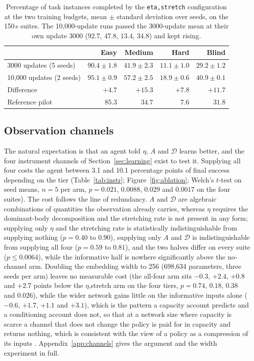 \documentclass[11pt]{article}
\newcommand{\dd}{\mathcal{D}}
\newcommand{\code}[1]{\texttt{\small #1}}
\begin{document}
\begin{table}[t]
\centering
\small
\begin{tabular}{lrrrr}
\toprule
& Easy & Medium & Hard & Blind \\
\midrule
3000 updates (5 seeds)   & $90.4 \pm 1.8$ & $41.9 \pm 2.3$ & $11.1 \pm 1.0$ & $29.2 \pm 1.2$ \\
10,000 updates (2 seeds) & $95.1 \pm 0.9$ & $57.2 \pm 2.5$ & $18.9 \pm 0.6$ & $40.9 \pm 0.1$ \\
\midrule
Difference               & $+4.7$ & $+15.3$ & $+7.8$ & $+11.7$ \\
Reference pilot          & $85.3$ & $34.7$ & $7.6$ & $31.8$ \\
\bottomrule
\end{tabular}
\caption{Percentage of task instances completed by the \code{eta,stretch}
configuration at the two training budgets, mean $\pm$ standard deviation
over seeds, on the 150\,s suites. The 10,000-update runs passed the
3000-update mean at their own update 3000 ($92.7$, $47.8$, $13.4$, $34.8$)
and kept rising.}
\label{tab:budget}
\end{table}

\subsection{Observation channels}
\label{sec:instruments}

The natural expectation is that an agent told $\eta$, $A$ and $\dd$ learns
better, and the four instrument channels of Section~\ref{sec:learning}
exist to test it. Supplying all four costs the agent between 3.1 and 10.1
percentage points of final success depending on the tier
(Table~\ref{tab:instr}; Figure~\ref{fig:ablation}; Welch's $t$-test on seed
means, $n = 5$ per arm, $p = 0.021$, $0.0088$, $0.029$ and $0.0017$ on the
four suites). The cost follows the line of redundancy. $A$ and $\dd$ are
algebraic combinations of quantities the observation already carries,
whereas $\eta$ requires the dominant-body decomposition and the stretching
rate is not present in any form; supplying
only $\eta$ and the stretching rate is statistically indistinguishable from
supplying nothing ($p = 0.40$ to $0.90$), supplying only $A$ and $\dd$ is
indistinguishable from supplying all four ($p = 0.59$ to $0.81$), and the
two halves differ on every suite ($p \le 0.0064$), while the informative
half is nowhere significantly above the no-channel arm. Doubling the
embedding width to 256 (698,634 parameters, three seeds per arm) leaves no
measurable cost (the all-four arm sits $-0.3$, $+2.4$, $+0.8$ and $+2.7$
points below the $\eta$,stretch arm on the four tiers, $p = 0.74$, $0.18$,
$0.38$ and $0.026$), while the wider network gains little on the
informative inputs alone ($-0.6$, $+1.7$, $+1.1$ and $+3.1$), which is the
pattern a capacity account predicts and a conditioning account does not,
so that at a network size where capacity is scarce a channel that does not
change the policy is paid for in capacity and returns nothing, which is
consistent with the view of a policy as a compression of its inputs
\cite{lai2024,kaelbling1998}. Appendix~\ref{app:channels} gives the
argument and the width experiment in full.
\end{document}
